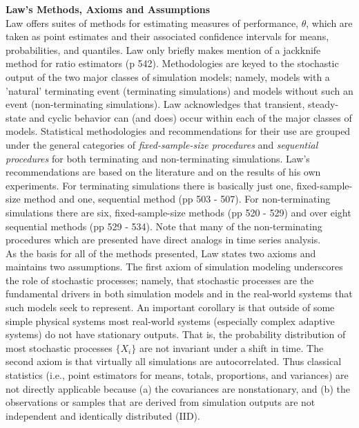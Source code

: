 \documentclass[a4paper,11pt]{article}
\begin{document}
\newpage
\textbf{Law's Methods, Axioms and Assumptions}\\

Law offers suites of methods for estimating measures of performance, $ \theta $, which are taken as point estimates and their associated confidence intervals for means, probabilities, and quantiles. Law only briefly makes mention of a jackknife method for ratio estimators (p 542). Methodologies are keyed to the stochastic output of the two major classes of simulation models; namely, models with a 'natural' terminating event (terminating simulations) and models without such an event (non-terminating simulations). Law acknowledges that transient, steady-state  and cyclic behavior can (and does) occur within each of the major classes of models.  Statistical methodologies and recommendations for their use are grouped under the general categories of \textit{fixed-sample-size procedures} and \textit{sequential procedures} for both terminating and non-terminating simulations.  Law's recommendations are based on the literature and on the results of his own experiments.  For terminating simulations there is basically just one, fixed-sample-size method and one, sequential method (pp 503 - 507).  For non-terminating simulations there are six, fixed-sample-size methods (pp 520 - 529) and over eight sequential methods (pp 529 - 534).  Note that many of the non-terminating procedures which are presented have direct analogs in time series analysis. \\

As the basis for all of the methods presented, Law states two axioms and maintains two assumptions. The first axiom of simulation modeling underscores the role of stochastic processes; namely, that stochastic processes are the fundamental drivers in both simulation models and in the real-world systems that such models seek to represent. An important corollary is that outside of some simple physical systems most real-world systems (especially complex adaptive systems) do not have stationary outputs.  That is, the probability distribution of most stochastic processes $ \{ X_{i}\} $ are not invariant under a shift in time. The second axiom is that virtually all simulations are autocorrelated.  Thus classical statistics (i.e., point estimators for means, totals, proportions, and variances) are not directly applicable because (a) the covariances are nonstationary, and (b) the observations or samples that are derived from simulation outputs are not independent and identically distributed (IID).\\
\end{document}
